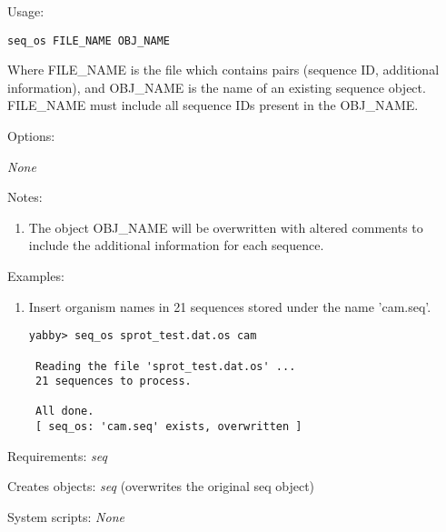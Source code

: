 \begin{description}


\item{Usage:}

{\tt seq\_os FILE\_NAME OBJ\_NAME}

Where FILE\_NAME is the file which contains pairs (sequence
ID, additional information), and OBJ\_NAME is the name of an
existing sequence object. FILE\_NAME must include all sequence
IDs present in the OBJ\_NAME.


\item{Options:}
\begin{description}
{\em None}
\end{description}


\item{Notes:}
\begin{enumerate}
\item The object OBJ\_NAME will be overwritten with altered comments
to include the additional information for each sequence.
\end{enumerate}


\item{Examples:}
\begin{enumerate}

\item Insert organism names in 21 sequences stored under the
name 'cam.seq'.
\begin{verbatim}
yabby> seq_os sprot_test.dat.os cam

 Reading the file 'sprot_test.dat.os' ...
 21 sequences to process.

 All done.
 [ seq_os: 'cam.seq' exists, overwritten ]
\end{verbatim}

\end{enumerate}


\item{Requirements:} {\em seq}


\item{Creates objects:} {\em seq} (overwrites the original seq object)


\item{System scripts:} {\em None}

\end{description}

